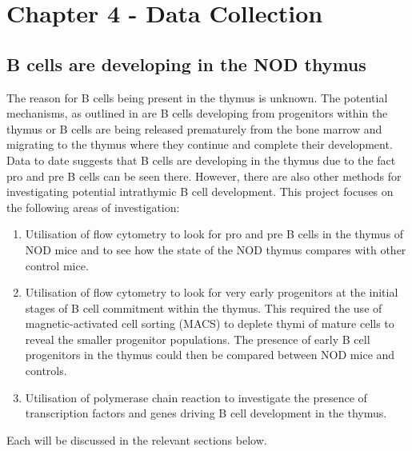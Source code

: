 
\chapter{Chapter 4 - Data Collection}




\section{B cells are developing in the NOD thymus}

The reason for B cells being present in the thymus is unknown. 
The potential mechanisms, as outlined in  are B cells developing from progenitors within the thymus or B cells are being released prematurely from the bone marrow and migrating to the thymus where they continue and complete their development.
Data to date suggests that B cells are developing in the thymus due to the fact pro and pre B cells can be seen there. 
However, there are also other methods for investigating potential intrathymic B cell development.
This project focuses on the following areas of investigation:

\begin{enumerate}
\item Utilisation of flow cytometry to look for pro and pre B cells in the thymus of NOD mice and to see how the state of the NOD thymus compares with other control mice.

\item Utilisation of flow cytometry to look for very early progenitors at the initial stages of B cell commitment within the thymus. 
This required the use of magnetic-activated cell sorting (MACS) to deplete thymi of mature cells to reveal the smaller progenitor populations. 
The presence of early B cell progenitors in the thymus could then be compared between NOD mice and controls. 

\item Utilisation of polymerase chain reaction to investigate the presence of transcription factors and genes driving B cell development in the  thymus. 
\end{enumerate}

Each will be discussed in the relevant sections below.

